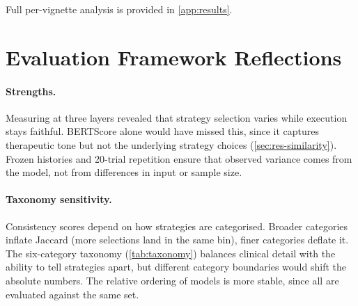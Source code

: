 Full per-vignette analysis is provided in \autoref{app:results}.



\section{Evaluation Framework Reflections}
\label{sec:disc-framework-design}

\paragraph{Strengths.}
Measuring at three layers revealed that strategy selection varies while
execution stays faithful. BERTScore alone would have missed this, since it
captures therapeutic tone but not the underlying strategy choices
(\autoref{sec:res-similarity}). Frozen histories and 20-trial repetition
\parencite{WA4QD3UE} ensure that observed variance comes from the model,
not from differences in input or sample size.

\paragraph{Taxonomy sensitivity.}
Consistency scores depend on how strategies are categorised. Broader
categories inflate Jaccard (more selections land in the same bin), finer
categories deflate it. The six-category taxonomy (\autoref{tab:taxonomy})
balances clinical detail with the ability to tell strategies apart, but
different category boundaries would shift the absolute numbers. The
relative ordering of models is more stable, since all are evaluated
against the same set.

